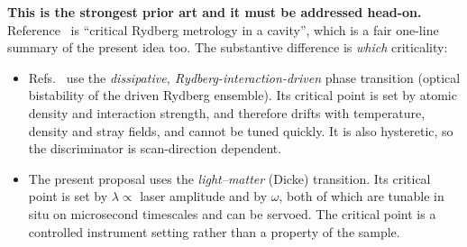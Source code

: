\documentclass[11pt,a4paper]{article}
\begin{document}
\textbf{This is the strongest prior art and it must be addressed head-on.}
Reference~\cite{Wang2025} is ``critical Rydberg metrology in a cavity'', which is a fair
one-line summary of the present idea too. The substantive difference is \emph{which}
criticality:
\begin{itemize}
  \item Refs.~\cite{Ding2022,Wang2025} use the \emph{dissipative, Rydberg-interaction-driven}
        phase transition (optical bistability of the driven Rydberg ensemble). Its critical
        point is set by atomic density and interaction strength, and therefore drifts with
        temperature, density and stray fields, and cannot be tuned quickly. It is also
        hysteretic, so the discriminator is scan-direction dependent.
  \item The present proposal uses the \emph{light--matter} (Dicke) transition. Its critical
        point is set by $\lambda \propto$ laser amplitude and by $\omega$, both of which are
        tunable in situ on microsecond timescales and can be servoed. The critical point
        is a controlled instrument setting rather than a property of the sample.
\end{itemize}
\end{document}
